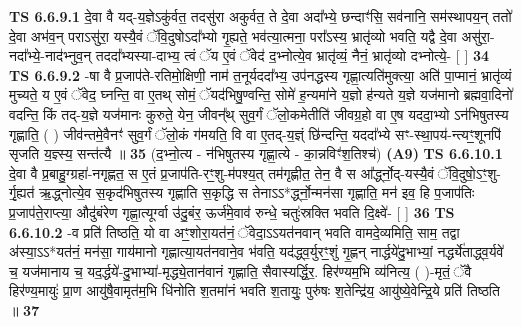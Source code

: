 \documentclass[17pt]{extarticle}
\begin{document}
                                        \textbf{ TS 6.6.9.1} \newline
                  दे॒वा वै यद्-य॒ज्ञेऽकु॑र्वत॒ तदसु॑रा अकुर्वत॒ ते दे॒वा अदा᳚भ्ये॒ छन्दाꣳ॑सि॒ सव॑नानि॒ सम॑स्थापय॒न् ततो॑ दे॒वा अभ॑व॒न् पराऽसु॑रा॒ यस्यै॒वं ॅवि॒दुषोऽदा᳚भ्यो गृ॒ह्यते॒ भव॑त्या॒त्मना॒ परा᳚ऽस्य॒ भ्रातृ॑व्यो भवति॒ यद्वै दे॒वा असु॑रा॒-नदा᳚भ्ये॒-नाद॑भ्नुव॒न् तददा᳚भ्यस्या-दाभ्य॒ त्वं ॅय ए॒वं ॅवेद॑ द॒भ्नोत्ये॒व भ्रातृ॑व्यं॒ नैनं॒ भ्रातृ॑व्यो दभ्नोत्ये॒- [  ] \textbf{  34} \newline
                  \newline
                                \textbf{ TS 6.6.9.2} \newline
                  -षा वै प्र॒जाप॑ते-रतिमो॒क्षिणी॒ नाम॑ त॒नूर्यददा᳚भ्य॒ उप॑नद्धस्य गृह्णा॒त्यति॑मुक्त्या॒ अति॑ पा॒प्मानं॒ भ्रातृ॑व्यं मुच्यते॒ य ए॒वं ॅवेद॒ घ्नन्ति॒ वा ए॒तथ् सोमं॒ ॅयद॑भिषु॒ण्वन्ति॒ सोमे॑ ह॒न्यमा॑ने य॒ज्ञो ह॑न्यते य॒ज्ञे यज॑मानो ब्रह्मवा॒दिनो॑ वदन्ति॒ किं तद्-य॒ज्ञे यज॑मानः कुरुते॒ येन॒ जीवन्᳚थ् सुव॒र्गं ॅलो॒कमेतीति॑ जीवग्र॒हो वा ए॒ष यददा॒भ्यो ऽन॑भिषुतस्य गृह्णाति॒ ( ) जीव॑न्तमे॒वैनꣳ॑ सुव॒र्गं ॅलो॒कं ग॑मयति॒ वि वा ए॒तद्-य॒ज्ञ्ं छि॑न्दन्ति॒ यददा᳚भ्ये सꣳ-स्था॒पय॑-न्त्यꣳ॒॒शूनपि॑ सृजति य॒ज्ञ्स्य॒ सन्त॑त्यै ॥ \textbf{  35} \newline
                  \newline
                      (द॒भ्नो॒त्य - न॑भिषुतस्य गृह्णा॒त्ये - का॒न्नविꣳ॑श॒तिश्च॑)  \textbf{(A9)} \newline \newline
                                        \textbf{ TS 6.6.10.1} \newline
                  दे॒वा वै प्र॒बाहु॒ग्ग्रहा॑-नगृह्णत॒ स ए॒तं प्र॒जाप॑ति-रꣳ॒॒शु-म॑पश्य॒त् तम॑गृह्णीत॒ तेन॒ वै स आ᳚र्द्ध्नो॒द्-यस्यै॒वं ॅवि॒दुषो॒ऽꣳ॒शु-र्गृ॒ह्यत॑ ऋ॒द्ध्नोत्ये॒व स॒कृद॑भिषुतस्य गृह्णाति स॒कृद्धि स तेनाऽऽ*र्द्ध्नो॒न्मन॑सा गृह्णाति॒ मन॑ इव॒ हि प॒जाप॑तिः प्र॒जाप॑ते॒राप्त्या॒ औदु॑बंरेण गृह्णा॒त्यूर्ग्वा उ॑दु॒बंर॒ ऊर्ज॑मे॒वाव॑ रुन्धे॒ चतुः॑स्रक्ति भवति दि॒क्ष्वे॑- [  ] \textbf{  36} \newline
                  \newline
                                \textbf{ TS 6.6.10.2} \newline
                  -व प्रति॑ तिष्ठति॒ यो वा अꣳ॒॒शोरा॒यत॑नं॒ ॅवेदा॒ऽऽयत॑नवान् भवति वामदे॒व्यमिति॒ साम॒ तद्वा अ॑स्या॒ऽऽ*यत॑नं॒ मन॑सा॒ गाय॑मानो गृह्णात्या॒यत॑नवाने॒व भ॑वति॒ यद॑द्ध्व॒र्युरꣳ॒॒शुं गृ॒ह्णन् नार्द्धये॑दु॒भाभ्यां॒ नर्द्ध्ये॑ताद्ध्व॒र्यवे॑ च॒ यज॑मानाय च॒ यद॒र्द्धये॑-दु॒भाभ्या॑-मृद्ध्ये॒तान॑वानं गृह्णाति॒ सैवास्यर्द्धि॒र॒. हिर॑ण्यम॒भि व्य॑नित्य॒ ( )-मृतं॒ ॅवै हिर॑ण्य॒मायुः॑ प्रा॒ण आयु॑षै॒वामृत॑म॒भि धि॑नोति श॒तमा॑नं भवति श॒तायुः॒ पुरु॑षः श॒तेन्द्रि॑य॒ आयु॑ष्ये॒वेन्द्रि॒ये प्रति॑ तिष्ठति ॥ \textbf{  37} \newline
\end{document}
